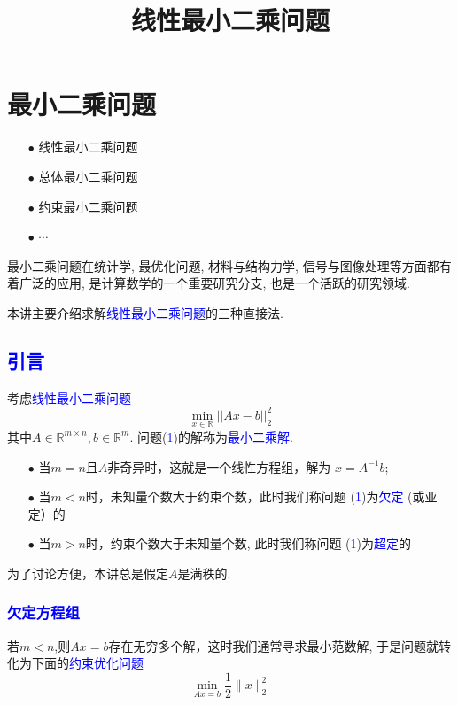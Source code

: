 \documentclass[12pt,a4paper]{article}
\title{线性最小二乘问题}
\begin{document}
\maketitle
\chapter{最小二乘问题}
\begin{itemize}     
    \item[$\bullet$]线性最小二乘问题
    \item[$\bullet$]总体最小二乘问题
    \item[$\bullet$]约束最小二乘问题
    \item[$\bullet$]$\cdots$
\end{itemize}

最小二乘问题在统计学, 最优化问题, 材料与结构力学, 信号与图像处理等方面都有着广泛的应用, 是计算数学的一个重要研究分支, 也是一个活跃的研究领域.

本讲主要介绍求解\textcolor{blue}{线性最小二乘问题}的三种直接法.
\section{\textcolor{blue}{引言}}
\noindent 考虑\textcolor{blue}{线性最小二乘问题}
\begin{equation}
    \min_{x\in\mathbb{R}} ||Ax-b||_2^2
\end{equation}
其中$A\in\mathbb{R}^{m\times n},b\in\mathbb{R}^m$.
问题(\textcolor{blue}{1})的解称为\textcolor{blue}{最小二乘解}.
\begin{itemize}
    \item[$\bullet$]当$m=n$且$A$非奇异时，这就是一个线性方程组，解为        $x=A^{-1}b$;
    \item[$\bullet$]当$m<n$时，未知量个数大于约束个数，此时我们称问题
        (\textcolor{blue}{1})为\textcolor{blue}{欠定}
    (或亚定）的
    \item[$\bullet$]当$m>n$时，约束个数大于未知量个数, 此时我们称问题
    (\textcolor{blue}{1})为\textcolor{blue}{超定}的
\end{itemize}

\noindent 为了讨论方便，本讲总是假定$A$是满秩的.
\subsection{\textcolor{blue}{欠定方程组}}
若$m<n$,则$Ax=b$存在无穷多个解，这时我们通常寻求最小范数解, 于是问题就转化为下面的\textcolor{blue}{约束优化问题}
\begin{equation}
\min _{Ax=b} \frac{1}{2}\|x\|_{2}^{2}
\end{equation}
\end{document}
